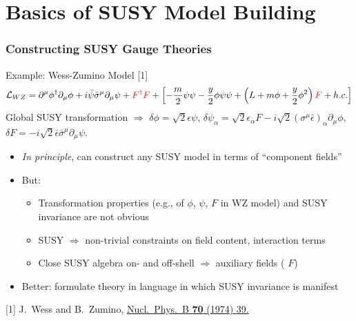 \documentclass[10pt,aspectratio=169]{beamer}
\begin{document}
\section{Basics of SUSY Model Building}

\begin{frame}
  \frametitle{Constructing SUSY Gauge Theories}
  \begin{block}{Example: Wess-Zumino Model [1]}
    \begin{equation*}
      \mathcal{L}_{WZ} = \partial^\mu \phi^\dagger \partial_\mu \phi
      + i \bar{\psi} \bar{\sigma}^\mu \partial_\mu \psi + {\color{red}
        F^\dagger F} + \left [ -\frac{m}{2} \psi \psi - \frac{y}{2} \phi \psi
        \psi + \left ( L + m \phi + \frac{y}{2} \phi^2 \right ) {\color{red} F}
        + h.c. \right ]
    \end{equation*}
    Global SUSY transformation $\Rightarrow$
    $\delta \phi = \sqrt{2} \epsilon \psi$,
    $\delta \psi_\alpha = \sqrt{2} \epsilon_\alpha F - i \sqrt{2}
    ( \sigma^\mu \bar{\epsilon})_\alpha \partial_\mu \phi$,
    $\delta F = -i \sqrt{2} \bar{\epsilon} \bar{\sigma}^\mu \partial_\mu \psi$.
  \end{block}
  \begin{itemize}\itemsep1em
  \item \emph{In principle}, can construct any SUSY model in terms of
    ``component fields''
  \item But:
    \begin{itemize}\itemsep0.5em
    \item Transformation properties (e.g., of $\phi$, $\psi$, $F$ in WZ model)
      and SUSY invariance \alert{are not obvious}
    \item SUSY $\Rightarrow$ \alert{non-trivial constraints on field
      content, interaction terms}
    \item Close SUSY algebra on- and off-shell $\Rightarrow$ \alert{auxiliary
      fields} ({\color{red} $F$})
    \end{itemize}
  \item {\color{blue} Better: formulate theory in language in which
    SUSY invariance is manifest}
  \end{itemize}
  \vfill
      { \tiny [1] J.~Wess and B.~Zumino,
        \href{http://dx.doi.org/10.1016/0550-3213(74)90355-1}{%
          Nucl.~Phys.~B \textbf{70} (1974) 39.}}
\end{frame}
\end{document}
